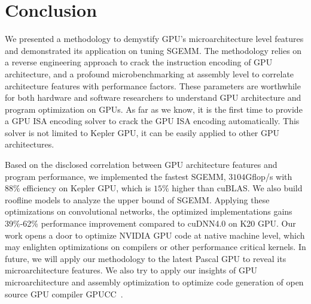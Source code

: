 \section{Conclusion}
\label{sec:conclusion}
We presented a methodology to demystify GPU's microarchitecture level features and demonstrated its 
application on tuning SGEMM. The methodology relies on a reverse engineering approach to crack the instruction encoding 
of GPU architecture, and a profound microbenchmarking at assembly level to correlate architecture features with 
performance factors. 
These parameters are worthwhile for both hardware and software researchers to 
understand GPU architecture and program optimization on GPUs. 
As far as we know, it is the first time to provide a GPU ISA encoding solver to crack the GPU ISA encoding automatically. 
This solver is not limited to Kepler GPU, it can be easily applied to other GPU architectures. 

Based on the disclosed correlation between GPU architecture features and program performance, we implemented the
fastest SGEMM,  $3104$Gflop/s with $88\%$ efficiency on Kepler GPU, which is $15\%$ higher than cuBLAS. 
We also build roofline models to analyze the upper bound of SGEMM. 
Applying these optimizations on convolutional networks, the optimized implementations gains 39\%-62\% performance improvement
compared to cuDNN4.0 on K20 GPU.
Our work opens a door to optimize NVIDIA GPU code at native machine level, which may enlighten optimizations on
compilers or other performance critical kernels.
In future, we will apply our methodology to the latest Pascal GPU to reveal its microarchitecture features.
We also try to apply our insights of GPU microarchitecture and assembly optimization to optimize code generation of open source GPU compiler
GPUCC~\cite{wu2016gpucc}.
